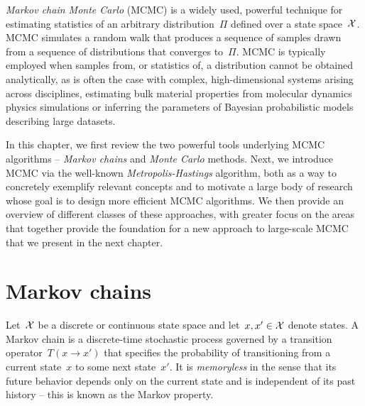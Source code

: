 \documentclass[angelino.tex]{subfiles}
\begin{document}
\emph{Markov chain Monte Carlo} (MCMC) is a widely used, powerful technique for 
estimating statistics of an arbitrary distribution~$\Pi$
defined over a state space~${\mathcal X}$.
MCMC simulates a random walk that produces a sequence of samples drawn from a 
sequence of distributions that converges to~$\Pi$.
MCMC is typically employed when samples from, or statistics of,
a distribution cannot be obtained analytically, as is often the case
with complex, high-dimensional systems arising across disciplines,
\eg estimating bulk material properties from molecular dynamics physics
simulations or inferring the parameters of Bayesian probabilistic models
describing large datasets.

In this chapter, we first review the two powerful tools underlying
MCMC algorithms -- \emph{Markov chains} and \emph{Monte Carlo} methods.
Next, we introduce MCMC via the well-known \emph{Metropolis-Hastings} algorithm,
both as a way to concretely exemplify relevant concepts and to motivate a large
body of research whose goal is to design more efficient MCMC algorithms.
We then provide an overview of different classes of these approaches, with
greater focus on the areas that together provide the foundation for a new
approach to large-scale MCMC that we present in the next chapter.

\section{Markov chains}

Let~${\mathcal X}$ be a discrete or continuous state space and
let~$x, x' \in {\mathcal X}$ denote states.
A Markov chain
is a discrete-time stochastic process governed by a
transition operator~${T(x \rightarrow x')}$ 
that specifies the probability of transitioning
from a current state~$x$ to some next state~$x'$.
It is \emph{memoryless} in the sense that its future behavior depends only
on the current state and is independent of its past history --
this is known as the Markov property.
\end{document}
